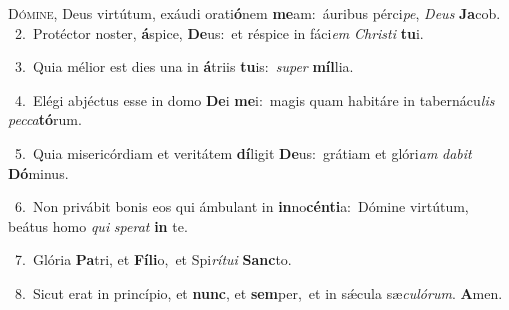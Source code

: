 \lettrine{\initial\textcolor{\initialcolor}{D}}{ómine,} Deus virtútum, exáudi orati\-\textbf{ó}\-nem \textbf{me}\-am:~\star áuribus pérci\-\textit{pe}\-, \textit{De}\-\textit{us} \textbf{Ja}\-cob.\\
{\numbfont\textcolor{\numbcolor}{~2.}}~Protéctor noster, \textbf{á}\-spice, \textbf{De}\-us:~\star et réspice in fáci\textit{em} \textit{Chris}\-\textit{ti} \textbf{tu}\-i.\par
{\numbfont\textcolor{\numbcolor}{~3.}}~Quia mélior est dies una in \textbf{á}\-triis \textbf{tu}\-is:~\star \textit{su}\-\textit{per} \textbf{míl}\-lia.\par
{\numbfont\textcolor{\numbcolor}{~4.}}~Elégi abjéctus esse in domo \textbf{De}\-i \textbf{me}\-i:~\star magis quam habitáre in tabernácu\textit{lis} \textit{pec}\-\textit{ca}\textbf{tó}rum.\par
{\numbfont\textcolor{\numbcolor}{~5.}}~Quia misericórdiam et veritátem \textbf{dí}\-ligit \textbf{De}\-us:~\star grátiam et glóri\textit{am} \textit{da}\-\textit{bit} \textbf{Dó}\-minus.\par
{\numbfont\textcolor{\numbcolor}{~6.}}~Non privábit bonis eos qui ámbulant in \textbf{in}\-no\-\textbf{cén}\-\textbf{ti}a:~\star Dómine virtútum, beátus homo \textit{qui} \textit{spe}\-\textit{rat} \textbf{in} te.\par
{\numbfont\textcolor{\numbcolor}{~7.}}~Glória \textbf{Pa}\-tri, et \textbf{Fí}\-\textbf{li}o,~\star et Spi\-\textit{rí}\-\textit{tu}\textit{i} \textbf{Sanc}\-to.\par
{\numbfont\textcolor{\numbcolor}{~8.}}~Sicut erat in princípio, et \textbf{nunc}\-, et \textbf{sem}\-per,~\star et in sǽcula sæ\-\textit{cu}\-\textit{ló}\textit{rum}. \textbf{A}\-men.\par

